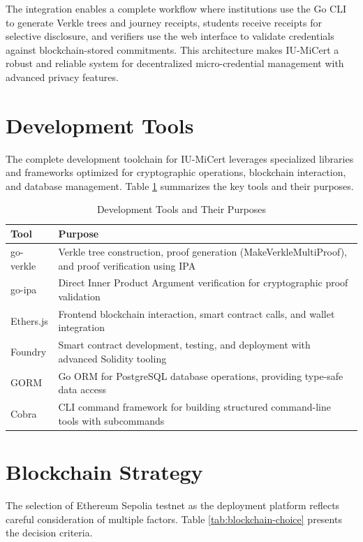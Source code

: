 The integration enables a complete workflow where institutions use the Go CLI to generate Verkle trees and journey receipts, students receive receipts for selective disclosure, and verifiers use the web interface to validate credentials against blockchain-stored commitments. This architecture makes IU-MiCert a robust and reliable system for decentralized micro-credential management with advanced privacy features.

\section{Development Tools}
\label{sec:development-tools}

The complete development toolchain for IU-MiCert leverages specialized libraries and frameworks optimized for cryptographic operations, blockchain interaction, and database management. Table \ref{tab:dev-tools} summarizes the key tools and their purposes.

\begin{table}[H]
\centering
\caption{Development Tools and Their Purposes}
\label{tab:dev-tools}
\begin{tabular}{|p{3.5cm}|p{9.5cm}|}
\hline
\textbf{Tool} & \textbf{Purpose} \\
\hline
go-verkle & Verkle tree construction, proof generation (MakeVerkleMultiProof), and proof verification using IPA \\
\hline
go-ipa & Direct Inner Product Argument verification for cryptographic proof validation \\
\hline
Ethers.js & Frontend blockchain interaction, smart contract calls, and wallet integration \\
\hline
Foundry & Smart contract development, testing, and deployment with advanced Solidity tooling \\
\hline
GORM & Go ORM for PostgreSQL database operations, providing type-safe data access \\
\hline
Cobra & CLI command framework for building structured command-line tools with subcommands \\
\hline
\end{tabular}
\end{table}

\section{Blockchain Strategy}
\label{sec:blockchain-strategy}

The selection of Ethereum Sepolia testnet as the deployment platform reflects careful consideration of multiple factors. Table \ref{tab:blockchain-choice} presents the decision criteria.

